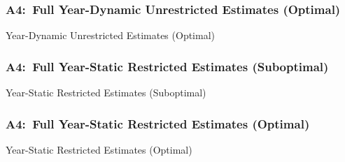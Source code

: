 \documentclass[12pt, aspectratio=169]{beamer}
\begin{document}
\begin{frame}[label=fydueo]
\frametitle{A4:\ Full Year-Dynamic Unrestricted Estimates (Optimal)}
\addtocounter{framenumber}{-1}
\begin{table}[htbp]
  \centering
  \addtocounter{table}{-1}
  \renewcommand{\thetable}{\arabic{table}b}
  \caption{Year-Dynamic Unrestricted Estimates (Optimal)}
  \vspace{5pt}
  \begin{adjustbox}{totalheight=.7\textheight}

  \end{adjustbox}
\end{table}%
\hyperlink{ydueo}{}
\end{frame}

\begin{frame}[label=fysres]
\frametitle{A4:\ Full Year-Static Restricted Estimates (Suboptimal)}
\begin{table}[htbp]
  \centering
  \renewcommand{\thetable}{\arabic{table}a}
  \caption{Year-Static Restricted Estimates (Suboptimal)}
  \vspace{5pt}
  \begin{adjustbox}{totalheight=.7\textheight}

  \end{adjustbox}
\end{table}%
\hyperlink{ysres}{}
\end{frame}

\begin{frame}[label=fysreo]
\frametitle{A4:\ Full Year-Static Restricted Estimates (Optimal)}
\addtocounter{framenumber}{-1}
\begin{table}[htbp]
  \centering
  \addtocounter{table}{-1}
  \renewcommand{\thetable}{\arabic{table}b}
  \caption{Year-Static Restricted Estimates (Optimal)}
  \vspace{5pt}
  \begin{adjustbox}{totalheight=.7\textheight}

  \end{adjustbox}
\end{table}%
\hyperlink{ysreo}{}
\end{frame}
\end{document}

